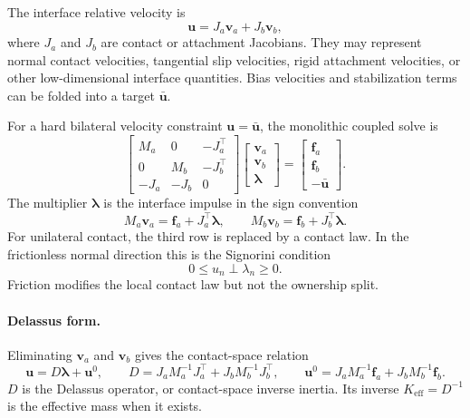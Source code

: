 \documentclass[11pt]{article}
\newcommand{\va}{\bm v_a}
\newcommand{\vb}{\bm v_b}
\newcommand{\uu}{\bm u}
\newcommand{\ubar}{\bar{\bm u}}
\newcommand{\fa}{\bm f_a}
\newcommand{\fb}{\bm f_b}
\newcommand{\lam}{\bm\lambda}
\newcommand{\Ja}{J_a}
\newcommand{\Jb}{J_b}
\newcommand{\Ma}{M_a}
\newcommand{\Mb}{M_b}
\newcommand{\Dop}{D}
\newcommand{\Keff}{K_{\mathrm{eff}}}
\begin{document}
The interface relative velocity is
\begin{equation}
    \uu = \Ja\va + \Jb\vb,
    \label{eq:relative-velocity}
\end{equation}
where $\Ja$ and $\Jb$ are contact or attachment Jacobians. They may represent normal
contact velocities, tangential slip velocities, rigid attachment velocities, or other
low-dimensional interface quantities. Bias velocities and stabilization terms can be
folded into a target $\ubar$.

For a hard bilateral velocity constraint $\uu=\ubar$, the monolithic coupled solve is
\begin{equation}
\begin{bmatrix}
\Ma & 0 & -\Ja^\top \\
0 & \Mb & -\Jb^\top \\
-\Ja & -\Jb & 0
\end{bmatrix}
\begin{bmatrix}
\va \\ \vb \\ \lam
\end{bmatrix}
=
\begin{bmatrix}
\fa \\ \fb \\ -\ubar
\end{bmatrix}.
\label{eq:global-kkt}
\end{equation}
The multiplier $\lam$ is the interface impulse in the sign convention
\[
    \Ma\va = \fa + \Ja^\top\lam,\qquad
    \Mb\vb = \fb + \Jb^\top\lam .
\]
For unilateral contact, the third row is replaced by a contact law. In the frictionless
normal direction this is the Signorini condition
\[
    0 \leq u_n \perp \lambda_n \geq 0 .
\]
Friction modifies the local contact law but not the ownership split.

\paragraph{Delassus form.}
Eliminating $\va$ and $\vb$ gives the contact-space relation
\begin{equation}
    \uu = \Dop\lam + \uu^0,\qquad
    \Dop =
        \Ja\Ma^{-1}\Ja^\top
      + \Jb\Mb^{-1}\Jb^\top,\qquad
    \uu^0 =
        \Ja\Ma^{-1}\fa
      + \Jb\Mb^{-1}\fb .
    \label{eq:delassus}
\end{equation}
$\Dop$ is the Delassus operator, or contact-space inverse inertia. Its inverse
$\Keff=\Dop^{-1}$ is the effective mass when it exists.
\end{document}
